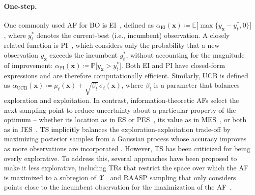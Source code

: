 \documentclass[accepted]{uai2025}
\begin{document}
\paragraph{One-step.} 
One commonly used \ac{AF} for \ac{BO} is \acf{EI}~\citep{jones1998efficient}, defined as $ \alpha_{\text{EI}}(\bm{x}) \coloneqq \mathbb{E}\bigl[\max\{y_{\bm{x}} - y_t^\ast, 0\}\bigr]$, where $y_t^\ast$ denotes the current-best (i.e., incumbent) observation. A closely related function is \ac{PI}~\citep{jones2001taxonomy}, which considers only the probability that a new observation $y_{\bm{x}}$ exceeds the incumbent $y_t^\ast$, without accounting for the magnitude of improvement: $ \alpha_{\text{PI}}(\bm{x}) \coloneqq \mathbb{P}\bigl[y_{\bm{x}} > y_t^\ast\bigr]$. Both \ac{EI} and \ac{PI} have closed-form expressions and are therefore computationally efficient. Similarly, \ac{UCB} is defined as $ \alpha_{\text{UCB}}(\bm{x}) \coloneqq \mu_t(\bm{x}) + \sqrt{\beta_t}\,\sigma_t(\bm{x})$, where $\beta_t$ is a parameter that balances exploration and exploitation. In contrast, information-theoretic \acp{AF} select the next sampling point to reduce uncertainty about a particular property of the optimum -- whether its location as in \ac{ES} or \ac{PES}~\citep{hennig2012entropy, hernandez2014predictive}, its value as in \ac{MES}~\citep{wang2017max}, or both as in \ac{JES}~\citep{hvarfner2022joint, tu2022joint}. 
\ac{TS} implicitly balances the exploration-exploitation trade-off by maximizing posterior samples from a Gaussian process whose accuracy improves as more observations are incorporated \citep{bijl2016sequential}. However, \ac{TS} has been criticized for being overly explorative.
To address this, several approaches have been proposed to make it less explorative, including \acp{TR} that restrict the space over which the \ac{AF} is maximized to a subregion of $\mathcal{X}$~\citep{eriksson2019scalable} and \ac{RAASP} sampling that only considers points close to the incumbent observation for the maximization of the \ac{AF}~\citep{rashidi2024cylindrical}.
\end{document}
